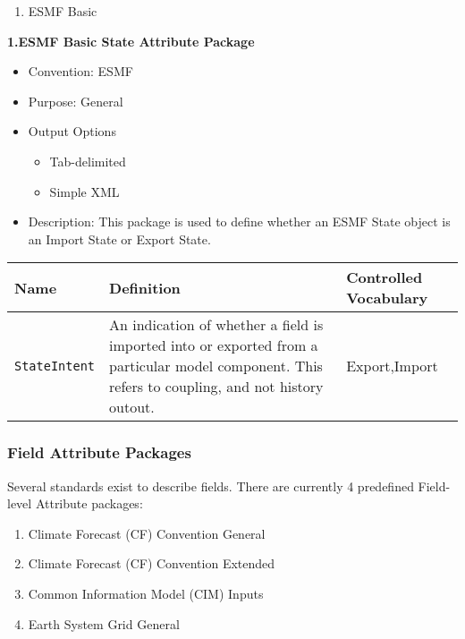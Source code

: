 \begin{enumerate}
    \item ESMF Basic
\end{enumerate}



\vspace{.20in}
{\bf 1.ESMF Basic State Attribute Package}

\begin{itemize}
    \item Convention: ESMF
    \item Purpose: General
    \item Output Options
    \begin{itemize}
        \item Tab-delimited
        \item Simple XML 
    \end{itemize}
    \item Description: This package is used to define whether an ESMF State object is an Import State or Export State.   
\end{itemize}

\begin{tabular}{|p{8cm}|p{20cm}|p{10cm}|}
    {\bf Name } & {\bf Definition} & {\bf Controlled Vocabulary} \\
    \hline\hline
    {\tt StateIntent} & An indication of whether a field is imported into or exported from a particular model component. This refers to coupling, and not history outout. & Export,Import \\
\end{tabular}


\vspace{.20in}
\subsubsection{Field Attribute Packages}
\label{FieldAttributePackages}

Several standards exist to describe fields. There are currently 4 predefined Field-level Attribute packages:

\begin{enumerate}
    \item Climate Forecast (CF) Convention General
    \item Climate Forecast (CF) Convention Extended
    \item Common Information Model (CIM) Inputs
    \item Earth System Grid General

\end{enumerate}

